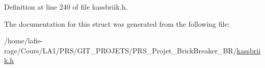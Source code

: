 Definition at line 240 of file kassbriik.\+h.



The documentation for this struct was generated from the following file\+:\begin{DoxyCompactItemize}
\item 
/home/lafie-\/rage/\+Cours/\+L\+A1/\+P\+R\+S/\+G\+I\+T\+\_\+\+P\+R\+O\+J\+E\+T\+S/\+P\+R\+S\+\_\+\+Projet\+\_\+\+Brick\+Breaker\+\_\+\+B\+R/\hyperlink{kassbriik_8h}{kassbriik.\+h}\end{DoxyCompactItemize}
